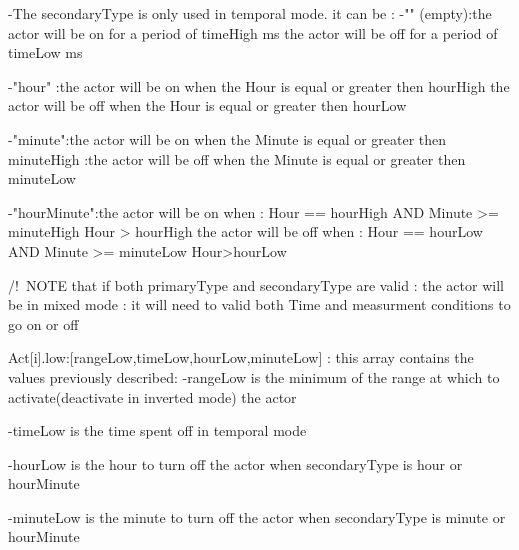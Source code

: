 \begin{DoxyVerb}                                             -The secondaryType is only used in temporal mode.
                                             it can be : -"" (empty):the actor will be on for a period of timeHigh ms
                                                                     the actor will be off for a period of timeLow ms

                                                         -"hour" :the actor will be on when the Hour is equal or greater then hourHigh
                                                                  the actor will be off when the Hour is equal or greater then hourLow

                                                         -"minute":the actor will be on when the Minute is equal or greater then minuteHigh
                                                                  :the actor will be off when the Minute is equal or greater then minuteLow

                                                         -"hourMinute":the actor will be on when : Hour == hourHigh AND Minute >= minuteHigh
                                                                                                   Hour > hourHigh
                                                                       the actor will be off when : Hour == hourLow AND Minute >= minuteLow
                                                                                                    Hour>hourLow

                                              /!\ NOTE  that if both primaryType and secondaryType are valid : the actor will be in
                                                 mixed mode : it will need to valid both Time and measurment conditions to go on or off

Act[i].low:[rangeLow,timeLow,hourLow,minuteLow] : this array contains the values previously described:
                                                  -rangeLow is the minimum of the range at which 
                                                  to activate(deactivate in inverted mode) the actor

                                                  -timeLow is the time spent off in temporal mode

                                                  -hourLow is the hour to turn off the actor when secondaryType is hour or hourMinute

                                                  -minuteLow is the minute to turn off the actor when secondaryType is minute or hourMinute



\end{DoxyVerb}
